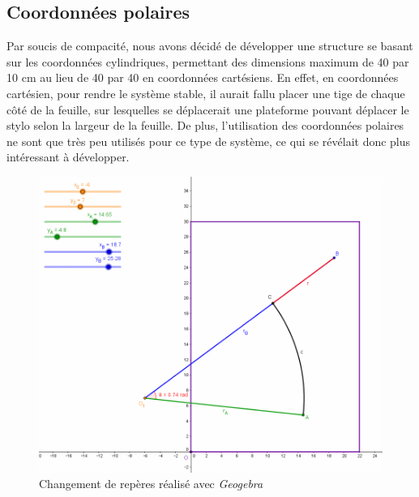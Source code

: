 \documentclass[12pt,a4paper]{report}
\begin{document}
\subsection*{Coordonnées polaires}
Par soucis de compacité, nous avons décidé de développer une structure se basant sur les coordonnées cylindriques, permettant des dimensions maximum de 40 par 10 cm au lieu de 40 par 40 en coordonnées cartésiens. En effet, en coordonnées cartésien, pour rendre le système stable, il aurait fallu placer une tige de chaque côté de la feuille, sur lesquelles se déplacerait une plateforme pouvant déplacer le stylo selon la largeur de la feuille. De plus, l'utilisation des coordonnées polaires ne sont que très peu utilisés pour ce type de système, ce qui se révélait donc plus intéressant à développer.
\begin{figure}[!h]
 \center
 \includegraphics[scale=0.5]{../pictures/Changement_repere}
 \caption{Changement de repères réalisé avec \emph{Geogebra}}
\end{figure}
\end{document}
